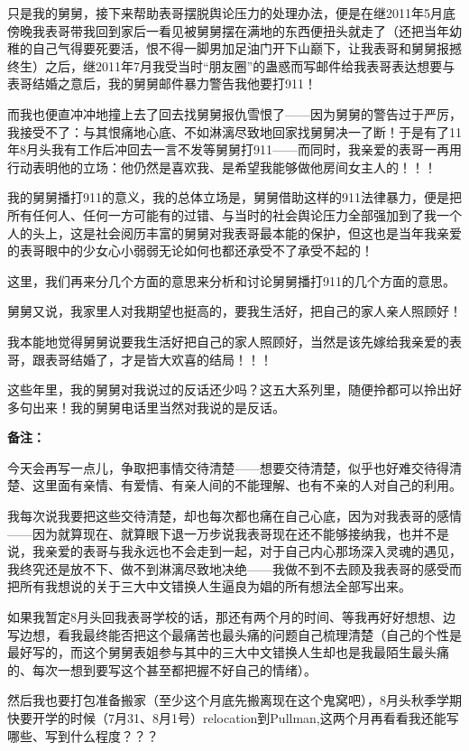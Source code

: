 \documentclass[9pt, b5paper]{article}
\begin{document}
只是我的舅舅，接下来帮助表哥摆脱舆论压力的处理办法，便是在继2011年5月底傍晚我表哥带我回到家后一看见被舅舅摆在满地的东西便扭头就走了（还把当年幼稚的自己气得要死要活，恨不得一脚男加足油门开下山巅下，让我表哥和舅舅报撼终生）之后，继2011年7月我受当时“朋友圈”的蛊惑而写邮件给我表哥表达想要与表哥结婚之意后，我的舅舅邮件暴力警告我他要打911！

而我也便直冲冲地撞上去了回去找舅舅报仇雪恨了——因为舅舅的警告过于严厉，我接受不了：与其恨痛地心底、不如淋漓尽致地回家找舅舅决一了断！于是有了11年8月头我有工作后冲回去一言不发等舅舅打911——而同时，我亲爱的表哥一再用行动表明他的立场：他仍然是喜欢我、是希望我能够做他房间女主人的！！！

我的舅舅播打911的意义，我的总体立场是，舅舅借助这样的911法律暴力，便是把所有任何人、任何一方可能有的过错、与当时的社会舆论压力全部强加到了我一个人的头上，这是社会阅历丰富的舅舅对我表哥最本能的保护，但这也是当年我亲爱的表哥眼中的少女心小弱弱无论如何也都还承受不了承受不起的！

这里，我们再来分几个方面的意思来分析和讨论舅舅播打911的几个方面的意思。 

舅舅又说，我家里人对我期望也挺高的，要我生活好，把自己的家人亲人照顾好！

我本能地觉得舅舅说要我生活好把自己的家人照顾好，当然是该先嫁给我亲爱的表哥，跟表哥结婚了，才是皆大欢喜的结局！！！

这些年里，我的舅舅对我说过的反话还少吗？这五大系列里，随便拎都可以拎出好多句出来！我的舅舅电话里当然对我说的是反话。 

\textbf{备注：}

今天会再写一点儿，争取把事情交待清楚——想要交待清楚，似乎也好难交待得清楚、这里面有亲情、有爱情、有亲人间的不能理解、也有不亲的人对自己的利用。

我每次说我要把这些交待清楚，却也每次都也痛在自己心底，因为对我表哥的感情——因为就算现在、就算眼下退一万步说我表哥现在还不能够接纳我，也并不是说，我亲爱的表哥与我永远也不会走到一起，对于自己内心那场深入灵魂的遇见，我终究还是放不下、做不到淋漓尽致地决绝——我做不到不去顾及我表哥的感受而把所有我想说的关于三大中文错换人生逼良为娼的所有想法全部写出来。

如果我暂定8月头回我表哥学校的话，那还有两个月的时间、等我再好好想想、边写边想，看我最终能否把这个最痛苦也最头痛的问题自己梳理清楚（自己的个性是最好写的，而这个舅舅表姐参与其中的三大中文错换人生却也是我最陌生最头痛的、每次一想到要写这个甚至都把握不好自己的情绪）。

然后我也要打包准备搬家（至少这个月底先搬离现在这个鬼窝吧），8月头秋季学期快要开学的时候（7月31、8月1号）relocation到Pullman,这两个月再看看我还能写哪些、写到什么程度？？？
\end{document}
